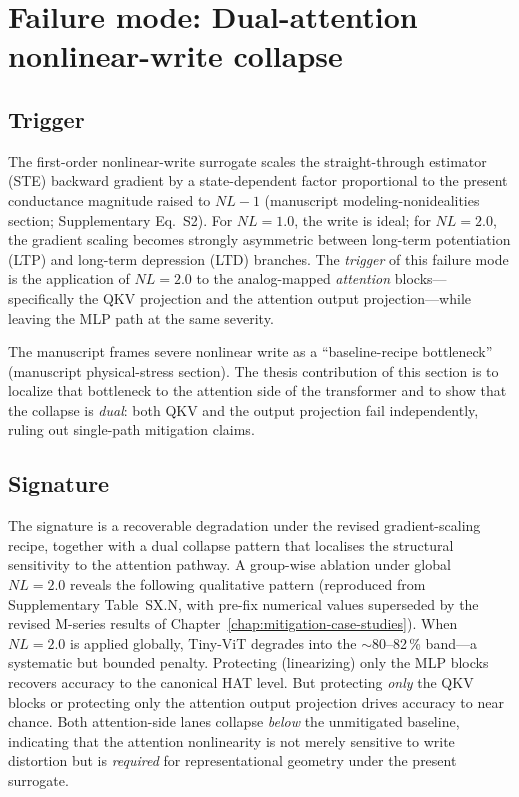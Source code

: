 \section{Failure mode: Dual-attention nonlinear-write collapse}
\label{sec:failure-dual-attention-nl}

\subsection{Trigger}

The first-order nonlinear-write surrogate scales the straight-through estimator (STE) backward gradient by a state-dependent factor proportional to the present conductance magnitude raised to $NL-1$ (manuscript modeling-nonidealities section; Supplementary Eq.~S2).  For $NL=1.0$, the write is ideal; for $NL=2.0$, the gradient scaling becomes strongly asymmetric between long-term potentiation (LTP) and long-term depression (LTD) branches.  The \emph{trigger} of this failure mode is the application of $NL=2.0$ to the analog-mapped \emph{attention} blocks---specifically the QKV projection and the attention output projection---while leaving the MLP path at the same severity.

The manuscript frames severe nonlinear write as a ``baseline-recipe bottleneck'' (manuscript physical-stress section).  The thesis contribution of this section is to localize that bottleneck to the attention side of the transformer and to show that the collapse is \emph{dual}: both QKV and the output projection fail independently, ruling out single-path mitigation claims.

\subsection{Signature}

The signature is a recoverable degradation under the revised gradient-scaling recipe, together with a dual collapse pattern that localises the structural sensitivity to the attention pathway.  A group-wise ablation under global $NL=2.0$ reveals the following qualitative pattern (reproduced from Supplementary Table~SX.N, with pre-fix numerical values superseded by the revised M-series results of Chapter~\ref{chap:mitigation-case-studies}).  When $NL=2.0$ is applied globally, Tiny-ViT degrades into the $\sim$80--82\,\% band---a systematic but bounded penalty.  Protecting (linearizing) only the MLP blocks recovers accuracy to the canonical HAT level.  But protecting \emph{only} the QKV blocks or protecting only the attention output projection drives accuracy to near chance.  Both attention-side lanes collapse \emph{below} the unmitigated baseline, indicating that the attention nonlinearity is not merely sensitive to write distortion but is \emph{required} for representational geometry under the present surrogate.

